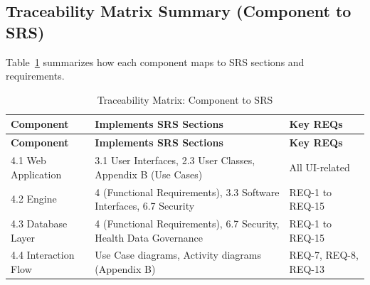 \subsection{Traceability Matrix Summary (Component to SRS)}
Table~\ref{tab:traceability} summarizes how each component maps to SRS sections and requirements.
\begin{longtable}{%
		p{} 
		p{} 
		p{}}
	
	\caption{Traceability Matrix: Component to SRS}
	\label{tab:traceability} \\
	
	\toprule
	\textbf{Component} & \textbf{Implements SRS Sections} & \textbf{Key REQs} \\
	\midrule
	\endfirsthead
	
	\toprule
	\textbf{Component} & \textbf{Implements SRS Sections} & \textbf{Key REQs} \\
	\midrule
	\endhead
	
	4.1 Web Application & 3.1 User Interfaces, 2.3 User Classes, Appendix B (Use Cases) & All UI-related \\[6pt]
	
	4.2 Engine & 4 (Functional Requirements), 3.3 Software Interfaces, 6.7 Security & REQ-1 to REQ-15 \\[6pt]
	
	4.3 Database Layer & 4 (Functional Requirements), 6.7 Security, Health Data Governance & REQ-1 to REQ-15 \\[6pt]
	
	4.4 Interaction Flow & Use Case diagrams, Activity diagrams (Appendix B) & REQ-7, REQ-8, REQ-13 \\
	
	\bottomrule
\end{longtable}